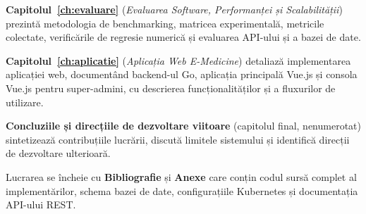 \textbf{Capitolul~\ref{ch:evaluare}} (\emph{Evaluarea Software, Performanței și
Scalabilității}) prezintă metodologia de benchmarking, matricea experimentală,
metricile colectate, verificările de regresie numerică și evaluarea API-ului și a
bazei de date.

\textbf{Capitolul~\ref{ch:aplicatie}} (\emph{Aplicația Web E-Medicine})
detaliază implementarea aplicației web, documentând backend-ul Go, aplicația
principală Vue.js și consola Vue.js pentru super-admini, cu descrierea
funcționalităților și a fluxurilor de utilizare.

\textbf{Concluziile și direcțiile de dezvoltare viitoare} (capitolul final,
nenumerotat) sintetizează contribuțiile lucrării, discută limitele sistemului și
identifică direcții de dezvoltare ulterioară.

Lucrarea se încheie cu \textbf{Bibliografie} și \textbf{Anexe} care conțin
codul sursă complet al implementărilor, schema bazei de date, configurațiile
Kubernetes și documentația API-ului REST.
